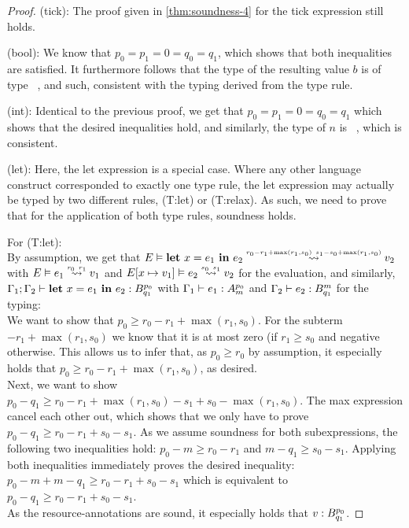 \begin{proof}

(tick): The proof given in \cref{thm:soundness-4} for the tick expression still holds.

(bool): We know that \(p_0 = p_1 = 0 = q_0 = q_1\), which shows that both inequalities are satisfied. It furthermore follows that the type of the resulting value \(b\) is of type \bool~, and such, consistent with the typing derived from the type rule.

(int): Identical to the previous proof, we get that \(p_0 = p_1 = 0 = q_0 = q_1\) which shows that the desired inequalities hold, and similarly, the type of \(n\) is \typeint~, which is consistent.

(let): Here, the let expression is a special case. Where any other language construct corresponded to exactly one type rule, the let expression may actually be typed by two different rules, (T:let) or (T:relax). As such, we need to prove that for the application of both type rules, soundness holds.  

For (T:let):\\
By assumption, we get that \(\evals{E}{\letexp{x}{e_1}{e_2}}{v_2}{r_0 - r_1 + \max(r_1, s_0)}{s_1 - s_0 + \max(r_1, s_0)}\) with \(\evals{E}{e_1}{v_1}{r_0}{r_1}\) and \(\evals{\envaugment{E}{x}{v_1}}{e_2}{v_2}{s_0}{s_1}\) for the evaluation, and similarly, \(\Gamma_1;\Gamma_2 \vdash \mathbf{let}~x = e_1~\mathbf{in}~e_2 : B ^{p_0}_{q_1}\) with \(\Gamma_1 \vdash e_1 : A ^{p_0}_{m}\) and \(\Gamma_2 \vdash e_2 : B ^{m}_{q_1}\) for the typing: \\  
We want to show that \(p_0 \geq r_0 - r_1 + \max(r_1, s_0)\). For the subterm \(- r_1 + \max(r_1, s_0)\) we know that it is at most zero (if \(r_1 \geq s_0\) and negative otherwise. This allows us to infer that, as \(p_0 \geq r_0\) by assumption, it especially holds that \(p_0 \geq r_0 - r_1 + \max(r_1, s_0)\), as desired.  \\
Next, we want to show \(p_0 - q_1 \geq r_0 - r_1 + \max(r_1, s_0) - s_1 + s_0 - \max(r_1, s_0)\). The max expression cancel each other out, which shows that we only have to prove \(p_0 - q_1 \geq r_0 - r_1 + s_0 - s_1\). As we assume soundness for both subexpressions, the following two inequalities hold: \(p_0 - m \geq r_0 - r_1\) and \(m - q_1 \geq s_0 - s_1\). Applying both inequalities immediately proves the desired inequality: \(p_0 - m + m - q_1 \geq r_0 - r_1 + s_0 - s_1\) which is equivalent to \(p_0 - q_1 \geq r_0 - r_1 + s_0 - s_1\).\\
As the resource-annotations are sound, it especially holds that \(v : B ^{p_0}_{q_1}\).


\end{proof}
